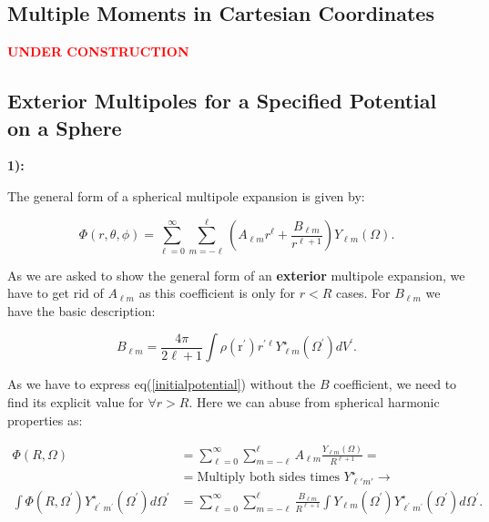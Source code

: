 \subsection{Multiple Moments in Cartesian Coordinates}\label{Multiple Moments in Cartesian Coordinates}
\textbf{\textcolor{red}{UNDER CONSTRUCTION}}


\subsection{Exterior Multipoles for a Specified Potential on a Sphere}\label{Exterior Multipoles for a Specified Potential on a Sphere}


\textbf{1):}

The general form of a spherical multipole expansion is given by:

\begin{equation}\label{initialpotential}
	\Phi(r,\theta, \phi)=\sum_{\ell=0}^{\infty} \sum_{m=-\ell}^{\ell}\left( A_{\ell m} r^{\ell}  + \frac{B_{\ell m}}{r^{\ell+1}} \right) Y_{\ell m}(\Omega).
\end{equation}

As we are asked to show the general form of an \textbf{exterior} multipole expansion, we have to get rid of $A_{\ell m}$ as this coefficient is only for $r< R$ cases. For $B_{\ell m}$ we have the basic description:

\begin{equation}
	B_{\ell m}=\frac{4 \pi}{2 \ell+1} \int \rho\left(\mathrm{r}^{\prime}\right) r^{\prime \ell} Y_{\ell m}^{\star}\left(\Omega^{\prime}\right) d V^{\prime}.
\end{equation}

As we have to express eq(\ref{initialpotential}) without the $B$ coefficient, we need to find its explicit value for $\forall r> R$. Here we can abuse from spherical harmonic properties as:
	
\begin{equation}
	\begin{split}
		\Phi(R, \Omega)&=\sum_{\ell=0}^{\infty} \sum_{m=-\ell}^{\ell} A_{\ell m} \frac{Y_{\ell m}(\Omega)}{R^{\ell+1}}= \\
		&= 	\text{Multiply both sides times $Y^{\star}_{\ell' m'}$}\rightarrow \\
		\int \Phi\left(R, \Omega^{\prime}\right) Y_{\ell^{\prime} m^{\prime}}^{\star}\left(\Omega^{\prime}\right) d \Omega^{\prime}&=\sum_{\ell=0}^{\infty} \sum_{m=-\ell}^{\ell} \frac{B_{\ell m}}{R^{\ell+1}} \int Y_{\ell m}\left(\Omega^{\prime}\right) Y_{\ell^{\prime} m^{\prime}}^{\star}\left(\Omega^{\prime}\right) d \Omega^{\prime} .
	\end{split}
\end{equation}

